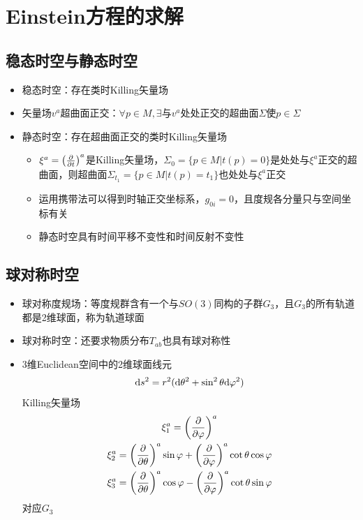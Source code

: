 \chapter{Einstein方程的求解}

\section{稳态时空与静态时空}

\begin{itemize}
    \item 稳态时空：存在类时Killing矢量场
    \item 矢量场$v^a$超曲面正交：$\forall p \in M, \exists$与$v^a$处处正交的超曲面$\Sigma$使$p \in \Sigma$
    \item 静态时空：存在超曲面正交的类时Killing矢量场
    \begin{itemize}
        \item $\xi^a=\left(\frac{\partial }{\partial t}\right)^a$是Killing矢量场，$\Sigma_0=\{p \in M \vert t(p)=0\}$是处处与$\xi^a$正交的超曲面，则超曲面$\Sigma_{t_1}=\{p \in M \vert t(p)=t_1\}$也处处与$\xi^a$正交
        \item 运用携带法可以得到时轴正交坐标系，$g_{0i}=0$，且度规各分量只与空间坐标有关
        \item 静态时空具有时间平移不变性和时间反射不变性
    \end{itemize}
\end{itemize}

\section{球对称时空}

\begin{itemize}
    \item 球对称度规场：等度规群含有一个与$SO(3)$同构的子群$G_3$，且$G_3$的所有轨道都是2维球面，称为轨道球面
    \item 球对称时空：还要求物质分布$T_{ab}$也具有球对称性
    \item 3维Euclidean空间中的2维球面线元
    \begin{gather*}
        \mathrm{d} s^2=r^2(\mathrm{d} \theta^2+\sin^2 \theta \mathrm{d} \varphi^2)
    \end{gather*}
    Killing矢量场
    \begin{gather*}
        \xi_1^a=\left(\frac{\partial }{\partial \varphi}\right)^a
        \\
        \xi_2^a=\left(\frac{\partial }{\partial \theta}\right)^a \sin \varphi + \left(\frac{\partial }{\partial \varphi}\right)^a \cot \theta \cos \varphi
        \\
        \xi_3^a=\left(\frac{\partial }{\partial \theta}\right)^a \cos \varphi - \left(\frac{\partial }{\partial \varphi}\right)^a \cot \theta \sin \varphi
    \end{gather*}
    对应$G_3$
\end{itemize}

